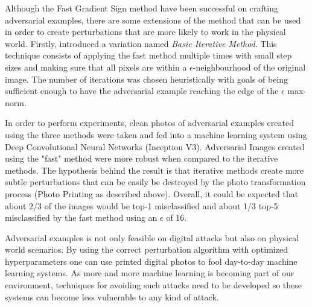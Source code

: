 Although the Fast Gradient Sign method have been successful on crafting adversarial examples, there are some extensions of the method that can be used in order to create perturbations that are more likely to work in the physical world. Firstly, \cite{goodfellow2016} introduced a variation named \textit{Basic Iterative Method}. This technique consists of applying the fast method multiple times with small step sizes and making sure that all pixels are within a $\epsilon$-neighbourhood of the original image. The number of iterations was chosen heuristically with goals of being sufficient enough to have the adversarial example reaching the edge of the $\epsilon$ max-norm.

In order to perform experiments, clean photos of adversarial examples created using the three methods were taken and fed into a machine learning system using Deep Convolutional Neural Networks (Inception V3). Adversarial Images created using the "fast" method were more robust when compared to the iterative methods. The hypothesis behind the result is that iterative methods create more subtle perturbations that can be easily be destroyed by the photo transformation process (Photo Printing as described above). Overall, it could be expected that about 2/3 of the images would be top-1 misclassified and about 1/3 top-5 misclassified by the fast method using an $\epsilon$ of 16.

Adversarial examples is not only feasible on digital attacks but also on physical world scenarios. By using the correct perturbation algorithm with optimized hyperparameters one can use printed digital photos to fool day-to-day machine learning systems. As more and more machine learning is becoming part of our environment, techniques for avoiding such attacks need to be developed so these systems can become less vulnerable to any kind of attack.